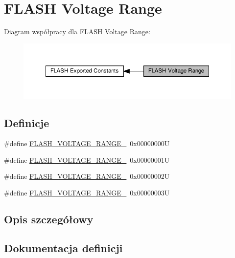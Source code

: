 \hypertarget{group___f_l_a_s_h_ex___voltage___range}{}\section{F\+L\+A\+SH Voltage Range}
\label{group___f_l_a_s_h_ex___voltage___range}
Diagram współpracy dla F\+L\+A\+SH Voltage Range\+:\nopagebreak
\begin{figure}[H]
\begin{center}
\leavevmode
\includegraphics[width=350pt]{group___f_l_a_s_h_ex___voltage___range}
\end{center}
\end{figure}
\subsection*{Definicje}
\begin{DoxyCompactItemize}
\item 
\#define \hyperlink{group___f_l_a_s_h_ex___voltage___range_ga5cadf49a63c968cde3b980e5139d398e}{F\+L\+A\+S\+H\+\_\+\+V\+O\+L\+T\+A\+G\+E\+\_\+\+R\+A\+N\+G\+E\+\_}~0x00000000U
\item 
\#define \hyperlink{group___f_l_a_s_h_ex___voltage___range_gad047be2bc7aa9be946b5b0c6b3062ef3}{F\+L\+A\+S\+H\+\_\+\+V\+O\+L\+T\+A\+G\+E\+\_\+\+R\+A\+N\+G\+E\+\_}~0x00000001U
\item 
\#define \hyperlink{group___f_l_a_s_h_ex___voltage___range_ga50950407a789684eec9216f49e0831a0}{F\+L\+A\+S\+H\+\_\+\+V\+O\+L\+T\+A\+G\+E\+\_\+\+R\+A\+N\+G\+E\+\_}~0x00000002U
\item 
\#define \hyperlink{group___f_l_a_s_h_ex___voltage___range_gabf8037a482f18815c5a67f287223a658}{F\+L\+A\+S\+H\+\_\+\+V\+O\+L\+T\+A\+G\+E\+\_\+\+R\+A\+N\+G\+E\+\_}~0x00000003U
\end{DoxyCompactItemize}


\subsection{Opis szczegółowy}


\subsection{Dokumentacja definicji}
\mbox{\label{group___f_l_a_s_h_ex___voltage___range_ga5cadf49a63c968cde3b980e5139d398e}} 
